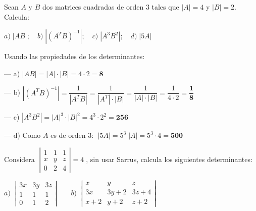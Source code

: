 
\begin{ejre}
Sean $A$ y $B$ dos matrices cuadradas de orden $3$ tales que $|A|=4$ y $|B|=2$. Calcula:

$a)\; |AB|; \quad b)\; |(A^TB)^{-1}|; \quad c)\; |A^3B^2|; \quad d)\; |5A|$
\end{ejre}

\begin{proofw}\renewcommand{\qedsymbol}{$\diamond$}
	Usando las propiedades de los determinantes:
	
\noindent --- a) $|AB|=|A|\cdot|B|=4\cdot 2 = \boldsymbol{8} $

\noindent --- b) $|(A^TB)^{-1}|=\dfrac {1}{|A^TB|}= \dfrac {1}{|A^T| \cdot |B|}=\dfrac {1}{|A| \cdot |B|}= \dfrac {1}{4 \cdot 2}= \boldsymbol{\dfrac 1 8}$

\noindent --- c) $|A^3B^2|=|A|^3 \cdot |B|^2=4^3 \cdot 2^2 =\boldsymbol{256}$

\noindent --- d) Como $A$ es de orden $3$:  $\; |5A|=5^3 \; |A| = 5^3 \cdot 4=\boldsymbol{500}$
\end{proofw}

\begin{ejre}
Considera $\;\left| \begin{matrix} 1&1&1\\x&y&z\\0&2&4  \end{matrix} \right|=4\;$, sin usar Sarrus, calcula los siguientes determinantes:

$a)\; \;  \left| \begin{matrix} 3x&3y&3z\\1&1&1\\0&1&2   \end{matrix} \right| \qquad b)\; \; 
 \left| \begin{matrix} x&y&z\\3x&3y+2&3z+4\\x+2&y+2&z+2  \end{matrix} \right|$
\end{ejre}

